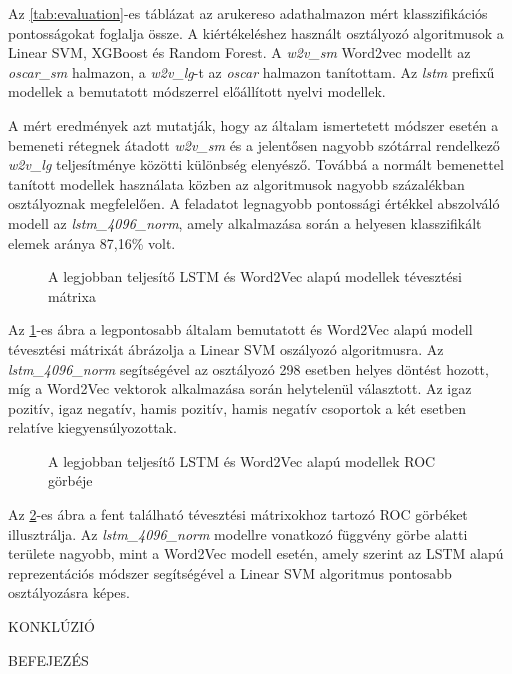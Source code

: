 Az \ref{tab:evaluation}-es táblázat az arukereso adathalmazon mért klasszifikációs pontosságokat foglalja össze. A kiértékeléshez használt osztályozó algoritmusok a Linear SVM, XGBoost és Random Forest. A \textit{w2v\_sm} Word2vec modellt az \textit{oscar\_sm} halmazon, a \textit{w2v\_lg}-t az \textit{oscar} halmazon tanítottam. Az \textit{lstm} prefixű modellek a bemutatott módszerrel előállított nyelvi modellek.

A mért eredmények azt mutatják, hogy az általam ismertetett módszer esetén a bemeneti rétegnek átadott \textit{w2v\_sm} és a jelentősen nagyobb szótárral rendelkező \textit{w2v\_lg} teljesítménye közötti különbség elenyésző. Továbbá a normált bemenettel tanított modellek használata közben az algoritmusok nagyobb százalékban osztályoznak megfelelően. A feladatot legnagyobb pontossági értékkel abszolváló modell az \textit{lstm\_4096\_norm}, amely alkalmazása során a helyesen klasszifikált elemek aránya 87,16\% volt.

\begin{figure}[H]
	\centering
	\caption{A legjobban teljesítő LSTM és Word2Vec alapú modellek tévesztési mátrixa}
	\label{fig:matrix}
\end{figure}

Az \ref{fig:matrix}-es ábra a legpontosabb általam bemutatott és Word2Vec alapú modell tévesztési mátrixát ábrázolja a Linear SVM oszályozó algoritmusra. Az \textit{lstm\_4096\_norm} segítségével az osztályozó 298 esetben helyes döntést hozott, míg a Word2Vec vektorok alkalmazása során helytelenül választott. Az igaz pozitív, igaz negatív, hamis pozitív, hamis negatív csoportok a két esetben relatíve kiegyensúlyozottak.

\begin{figure}[H]
	\centering
	\caption{A legjobban teljesítő LSTM és Word2Vec alapú modellek ROC görbéje}
	\label{fig:roc}
\end{figure}

Az \ref{fig:roc}-es ábra a fent található tévesztési mátrixokhoz tartozó ROC görbéket illusztrálja. Az \textit{lstm\_4096\_norm} modellre vonatkozó függvény görbe alatti területe nagyobb, mint a Word2Vec modell esetén, amely szerint az LSTM alapú reprezentációs módszer segítségével a Linear SVM algoritmus pontosabb osztályozásra képes.

KONKLÚZIÓ


BEFEJEZÉS











